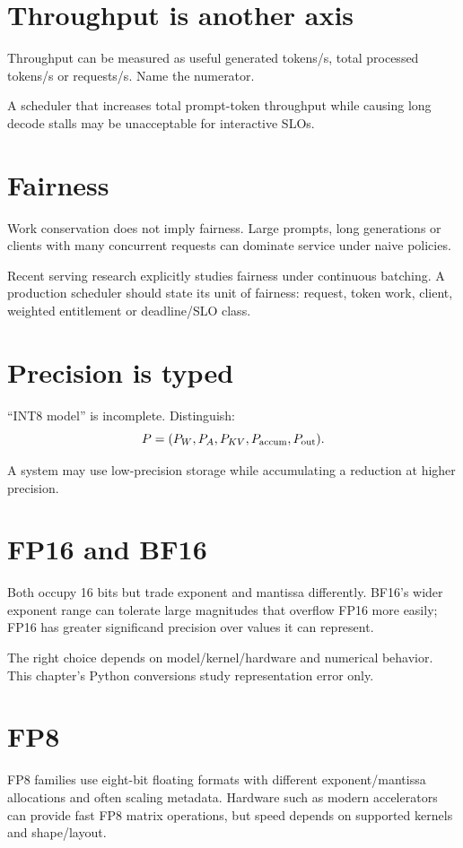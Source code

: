 \section{Throughput is another axis}
Throughput can be measured as useful generated tokens/s, total processed tokens/s or requests/s. Name the numerator.

A scheduler that increases total prompt-token throughput while causing long decode stalls may be unacceptable for interactive SLOs.


\section{Fairness}
Work conservation does not imply fairness. Large prompts, long generations or clients with many concurrent requests can dominate service under naive policies.

Recent serving research explicitly studies fairness under continuous batching. A production scheduler should state its unit of fairness: request, token work, client, weighted entitlement or deadline/SLO class.

\section{Precision is typed}
``INT8 model'' is incomplete. Distinguish:
\[
P=(P_W,P_A,P_{KV},P_{\rm accum},P_{\rm out}).
\]

A system may use low-precision storage while accumulating a reduction at higher precision.

\section{FP16 and BF16}
Both occupy 16 bits but trade exponent and mantissa differently. BF16's wider exponent range can tolerate large magnitudes that overflow FP16 more easily; FP16 has greater significand precision over values it can represent.

The right choice depends on model/kernel/hardware and numerical behavior. This chapter's Python conversions study representation error only.

\section{FP8}
FP8 families use eight-bit floating formats with different exponent/mantissa allocations and often scaling metadata. Hardware such as modern accelerators can provide fast FP8 matrix operations, but speed depends on supported kernels and shape/layout.

